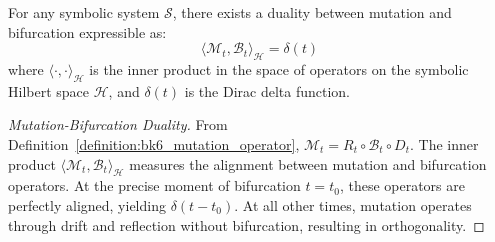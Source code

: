 \begin{proposition}
\label{prop:bk6_mutation_bifurcation_duality}
For any symbolic system $\mathcal{S}$, there exists a duality between mutation and bifurcation expressible as:
\begin{equation}
\langle \mathcal{M}_t, \mathcal{B}_t \rangle_{\mathcal{H}} = \delta(t)
\end{equation}
where $\langle \cdot, \cdot \rangle_{\mathcal{H}}$ is the inner product in the space of operators on the symbolic Hilbert space $\mathcal{H}$, and $\delta(t)$ is the Dirac delta function.
\begin{proof}[Mutation-Bifurcation Duality]
\label{proof:bk6_mutation_bifurcation_duality}
From Definition~\ref{definition:bk6_mutation_operator}, $\mathcal{M}_t = R_t \circ \mathcal{B}_t \circ D_t$.  
The inner product $\langle \mathcal{M}_t, \mathcal{B}_t \rangle_{\mathcal{H}}$ measures the alignment between mutation and bifurcation operators.  
At the precise moment of bifurcation $t = t_0$, these operators are perfectly aligned, yielding $\delta(t - t_0)$.  
At all other times, mutation operates through drift and reflection without bifurcation, resulting in orthogonality.
\end{proof}
\end{proposition}
